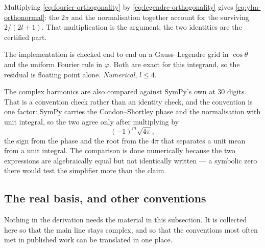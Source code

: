 Multiplying \eqref{eq:fourier-orthogonality} by
\eqref{eq:legendre-orthogonality} gives \eqref{eq:ylm-orthonormal}: the $2\pi$ and
the normalisation together account for the surviving $2/(2l+1)$.  That
multiplication is the argument; the two identities are the certified part.

The implementation is checked end to end on a Gauss--Legendre grid in
$\cos\theta$ and the uniform Fourier rule in $\varphi$.  Both are exact for this
integrand, so the residual is floating point alone.  \emph{Numerical}, $l \le 4$.

The complex harmonics are also compared against SymPy's own  at $30$
digits.  That is a convention check rather than an identity check, and the
convention is one factor: SymPy carries the Condon--Shortley phase and the
normalisation with unit integral, so the two agree only after multiplying by
\begin{equation}
  (-1)^{m}\sqrt{4\pi} ,
  \label{eq:sympy-factor}
\end{equation}
the sign from the phase and the root from the $4\pi$ that separates a unit mean
from a unit integral.  The comparison is done numerically because the two
expressions are algebraically equal but not identically written --- a symbolic
zero there would test the simplifier more than the claim.

\subsection{The real basis, and other conventions}
\label{sec:other-conventions}

Nothing in the derivation needs the material in this subsection.  It is collected here so
that the main line stays complex, and so that the conventions most often met in published
work can be translated in one place.


